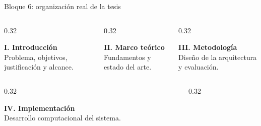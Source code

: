 \documentclass[aspectratio=169,10pt,spanish]{beamer}
\begin{document}
\begin{frame}{Bloque 6: organización real de la tesis}
    \begin{columns}[T,onlytextwidth]
        \begin{column}{0.32\textwidth}
            \begin{tcolorbox}[height=1.65cm,colback=bpBlue!7,colframe=bpBlue]
                \centering\small\textbf{\color{bpBlue}I. Introducción}\\[1mm]
                \scriptsize Problema, objetivos, justificación y alcance.
            \end{tcolorbox}
        \end{column}
        \begin{column}{0.32\textwidth}
            \begin{tcolorbox}[height=1.65cm,colback=bpGold!9,colframe=bpGold!90!black]
                \centering\small\textbf{\color{bpGold!80!black}II. Marco teórico}\\[1mm]
                \scriptsize Fundamentos y estado del arte.
            \end{tcolorbox}
        \end{column}
        \begin{column}{0.32\textwidth}
            \begin{tcolorbox}[height=1.65cm,colback=bpRust!7,colframe=bpRust]
                \centering\small\textbf{\color{bpRust}III. Metodología}\\[1mm]
                \scriptsize Diseño de la arquitectura y evaluación.
            \end{tcolorbox}
        \end{column}
    \end{columns}
    \vspace{0.16cm}
    \begin{columns}[T,onlytextwidth]
        \begin{column}{0.32\textwidth}
            \begin{tcolorbox}[height=1.65cm,colback=bpBlue!7,colframe=bpBlue]
                \centering\small\textbf{\color{bpBlue}IV. Implementación}\\[1mm]
                \scriptsize Desarrollo computacional del sistema.
            \end{tcolorbox}
        \end{column}
        \begin{column}{0.32\textwidth}
            \begin{tcolorbox}[height=1.65cm,colback=bpGold!9,colframe=bpGold!90!black]

\end{tcolorbox}
\end{column}
\end{columns}
\end{frame}
\end{document}
